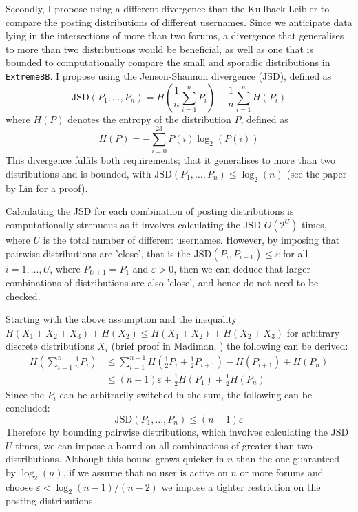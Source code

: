 \documentclass[10pt,a4paper,notitlepage]{article}
\begin{document}
Secondly, I propose using a different divergence than the Kullback-Leibler to compare the posting distributions of different usernames. Since we anticipate data lying in the intersections of more than two forums, a divergence that generalises to more than two distributions would be beneficial, as well as one that is bounded to computationally compare the small and sporadic distributions in \texttt{ExtremeBB}. I propose using the Jenson-Shannon divergence (JSD), defined as
\begin{equation}
\text{JSD}(P_{1},\hdots,P_{n})=H\left(\frac{1}{n}\sum_{i=1}^{n}P_{i}\right)-\frac{1}{n}\sum_{i=1}^{n}H(P_{i})
\end{equation}
where $H(P)$ denotes the entropy of the distribution $P$, defined as
\begin{equation}
H(P)=-\sum_{i=0}^{23}P(i)\log_{2}\left(P(i)\right)
\end{equation}
This divergence fulfils both requirements; that it generalises to more than two distributions and is bounded, with $\text{JSD}(P_{1},\hdots,P_{n})\leq \log_{2}(n)$ (see the paper \cite{Shan} by Lin for a proof).

Calculating the JSD for each combination of posting distributions is computationally strenuous as it involves calculating the JSD $O(2^{U})$ times, where $U$ is the total number of different usernames. However, by imposing that pairwise distributions are 'close', that is the $\text{JSD}(P_{i},P_{i+1})\leq\varepsilon$ for all $i=1,\hdots,U$, where $P_{U+1}=P_{1}$ and $\varepsilon >0$, then we can deduce that larger combinations of distributions are also 'close', and hence do not need to be checked. 

Starting with the above assumption and the inequality $H(X_{1}+X_{2}+X_{3})+H(X_{2})\leq H(X_{1}+X_{2})+H(X_{2}+X_{3})$ for arbitrary discrete distributions $X_{i}$ (brief proof in Madiman, \cite{madiman2008entropy}) the following can be derived:
\begin{equation}
\begin{aligned}
H\left(\sum_{i=1}^{n}\frac{1}{n}P_{i}\right) &\leq \sum_{i=1}^{n-1}H\left(\frac{1}{2}P_{i}+\frac{1}{2}P_{i+1}\right)-H\left(P_{i+1}\right)+H(P_{n})\\
&\leq (n-1)\varepsilon +\frac{1}{2}H(P_{1})+\frac{1}{2}H(P_{n})
\end{aligned}
\end{equation}
Since the $P_{i}$ can be arbitrarily switched in the sum, the following can be concluded:
\begin{equation}
\text{JSD}(P_{1},\hdots,P_{n})\leq (n-1)\varepsilon
\end{equation}
Therefore by bounding pairwise distributions, which involves calculating the JSD $U$ times, we can impose a bound on all combinations of greater than two distributions. Although this bound grows quicker in $n$ than the one guaranteed by $\log_{2}(n)$, if we assume that no user is active on $n$ or more forums and choose $\varepsilon < \log_{2}(n-1)/(n-2)$ we impose a tighter restriction on the posting distributions.
\end{document}
